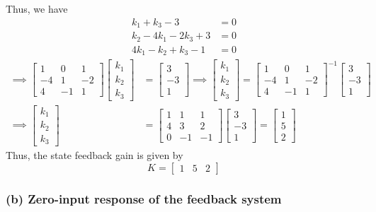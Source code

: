 Thus, we have
\begin{align*}
    k_1 + k_3 - 3         & = 0 \\
    k_2 - 4k_1 - 2k_3 + 3 & = 0 \\
    4k_1 - k_2 + k_3 - 1  & = 0
\end{align*}
\begin{align*}
    \implies
    \begin{bmatrix}
        1  & 0  & 1  \\
        -4 & 1  & -2 \\
        4  & -1 & 1
    \end{bmatrix}
    \begin{bmatrix}
        k_1 \\
        k_2 \\
        k_3
    \end{bmatrix}
     & =
    \begin{bmatrix}
        3  \\
        -3 \\
        1
    \end{bmatrix}
    \implies
    \begin{bmatrix}
        k_1 \\
        k_2 \\
        k_3
    \end{bmatrix}
    =
    \begin{bmatrix}
        1  & 0  & 1  \\
        -4 & 1  & -2 \\
        4  & -1 & 1
    \end{bmatrix}^{-1}
    \begin{bmatrix}
        3  \\
        -3 \\
        1
    \end{bmatrix}
    \\
    \implies
    \begin{bmatrix}
        k_1 \\
        k_2 \\
        k_3
    \end{bmatrix}
     & =
    \begin{bmatrix}
        1 & 1  & 1  \\
        4 & 3  & 2  \\
        0 & -1 & -1
    \end{bmatrix}
    \begin{bmatrix}
        3  \\
        -3 \\
        1
    \end{bmatrix}
    =
    \begin{bmatrix}
        1 \\
        5 \\
        2
    \end{bmatrix}
\end{align*}
Thus, the state feedback gain is given by
\begin{equation*}
    \boxed{
        K
        =
        \begin{bmatrix}
            1 & 5 & 2
        \end{bmatrix}
    }
\end{equation*}

\subsubsection*{(b) Zero-input response of the feedback system}
